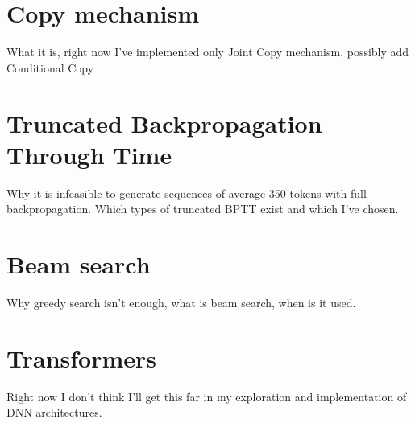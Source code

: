 \section{Copy mechanism}
What it is, right now I've implemented only Joint Copy mechanism, possibly add Conditional Copy

\section{Truncated Backpropagation Through Time}
Why it is infeasible to generate sequences of average 350 tokens with full backpropagation. Which types of truncated BPTT exist and which I've chosen.

\section{Beam search}
Why greedy search isn't enough, what is beam search, when is it used.

\section{Transformers}
Right now I don't think I'll get this far in my exploration and implementation of DNN architectures.
